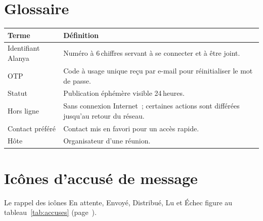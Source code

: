 \documentclass[11pt,a4paper,oneside]{report}
\newcommand{\champ}[1]{\og{}#1\fg{}}
\newcommand{\thd}[1]{\textbf{\textcolor{AlanyaIndigoDark}{#1}}}
\begin{document}
\section{Glossaire}
\begin{tabularx}{\linewidth}{@{}l X@{}}
\toprule
\thd{Terme} & \thd{D\'{e}finition}\\
\midrule
Identifiant Alanya & Num\'{e}ro \`{a} 6\,chiffres servant \`{a} se connecter et \`{a} \^{e}tre joint.\\
OTP & Code \`{a} usage unique re\c{c}u par e-mail pour r\'{e}initialiser le mot de passe.\\
Statut & Publication \'{e}ph\'{e}m\`{e}re visible 24\,heures.\\
Hors ligne & Sans connexion Internet~; certaines actions sont diff\'{e}r\'{e}es jusqu'au retour du r\'{e}seau.\\
Contact pr\'{e}f\'{e}r\'{e} & Contact mis en favori pour un acc\`{e}s rapide.\\
H\^{o}te & Organisateur d'une r\'{e}union.\\
\bottomrule
\end{tabularx}

\section{Ic\^{o}nes d'accus\'{e} de message}
Le rappel des ic\^{o}nes \champ{En attente}, \champ{Envoy\'{e}}, \champ{Distribu\'{e}},
\champ{Lu} et \champ{\'{E}chec} figure au tableau~\ref{tab:accuses}
(page~\pageref{tab:accuses}).
\end{document}
